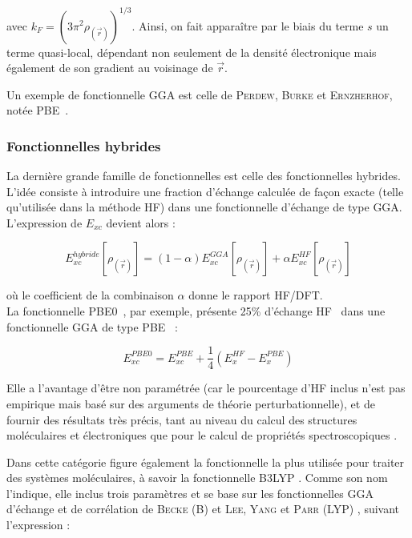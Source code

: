 \documentclass[12pt,a4paper]{book}
\begin{document}
	\noindent avec $k_{F} = (3 \pi^{2} \rho_{(\vec{r})})^{1/3}$. Ainsi, on fait apparaître par le biais du terme $s$ un terme quasi-local, dépendant non seulement de la densité électronique mais également de son gradient au voisinage de $\vec{r}$.
	
	Un exemple de fonctionnelle GGA est celle de \textsc{Perdew}, \textsc{Burke} et \textsc{Ernzherhof}, notée PBE~\cite{perdew1996generalized}.
	
	\subsubsection{Fonctionnelles hybrides}
	
	La dernière grande famille de fonctionnelles est celle des fonctionnelles hybrides. L’idée consiste à introduire une fraction d’échange calculée de façon exacte (telle qu’utilisée dans la méthode HF) dans une fonctionnelle d’échange de type GGA. L’expression de $E_{xc}$ devient alors :
	
	\begin{equation}
	E_{xc}^{hybride}[\rho_{(\vec{r})}] = (1- \alpha) E_{xc}^{GGA}[\rho_{(\vec{r})}] + \alpha E_{xc}^{HF}[\rho_{(\vec{r})}]
	\end{equation}
	
	\noindent où le coefficient de la combinaison $\alpha$ donne le rapport HF/DFT. \\
	La fonctionnelle PBE0~\cite{adamo1999toward}, par exemple, présente 25\% d’échange HF~\cite{adamo1997toward} dans une fonctionnelle GGA de type PBE~\cite{perdew1996generalized} :
	
	\begin{equation}
	E_{xc}^{PBE0} = E_{xc}^{PBE} + \frac{1}{4} (E_{x}^{HF} - E_{x}^{PBE})
	\end{equation}
	
	Elle a l’avantage d’être non paramétrée (car le pourcentage d’HF inclus n’est pas empirique mais basé sur des arguments de théorie perturbationnelle), et de fournir des résultats très précis, tant au niveau du calcul des structures moléculaires et électroniques que pour le calcul de propriétés spectroscopiques \cite{adamo1999toward}.
	
	Dans cette catégorie figure également la fonctionnelle la plus utilisée pour traiter des systèmes moléculaires, à savoir la fonctionnelle B3LYP \cite{becke1993density}. Comme son nom l’indique, elle inclus trois paramètres et se base sur les fonctionnelles GGA d’échange et de corrélation de \textsc{Becke} (B) \cite{becke1988density} et \textsc{Lee}, \textsc{Yang} et \textsc{Parr} (LYP) \cite{chengteh1988development}, suivant l’expression :
	
\end{document}
